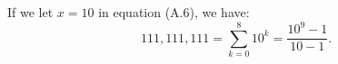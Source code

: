 \exercise
If we let $x=10$ in equation (A.6), we have:
\[
    111{,}111{,}111 = \sum_{k=0}^8 10^k = \frac{10^9-1}{10-1}.
\]
